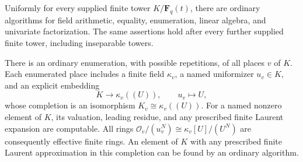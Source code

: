 \begin{lemma}
\label{C:global-function-field-arithmetic}
Uniformly for every supplied finite tower $K/\mathbf F_q(t)$,
there are ordinary algorithms for field arithmetic, equality,
enumeration, linear algebra, and univariate factorization.
The same assertions hold after every further supplied finite
tower, including inseparable towers.

There is an ordinary enumeration, with possible repetitions,
of all places $v$ of $K$. Each enumerated place includes a
finite field $\kappa_v$, a named uniformizer $u_v\in K$, and
an explicit embedding
\[
             K\longrightarrow \kappa_v((U)),
             \qquad u_v\longmapsto U,
\]
whose completion is an isomorphism
$K_v\cong\kappa_v((U))$.
For a named nonzero element of $K$, its valuation, leading
residue, and any prescribed finite Laurent expansion are
computable. All rings
$\mathcal O_v/(u_v^N)\cong\kappa_v[U]/(U^N)$ are consequently
effective finite rings. An element of $K$ with any prescribed
finite Laurent approximation in this completion can be found
by an ordinary algorithm.
\end{lemma}

